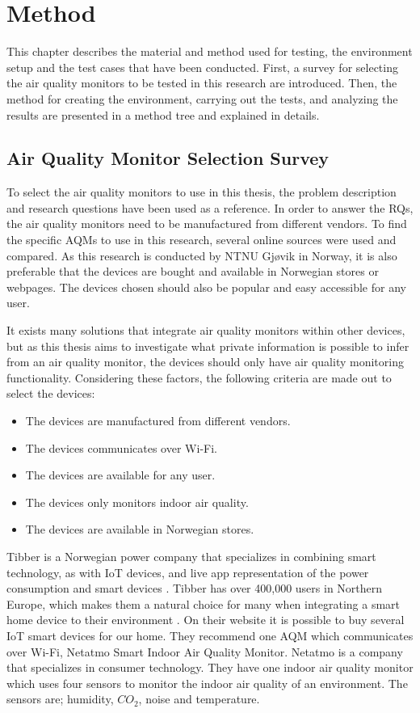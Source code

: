\chapter{Method}
This chapter describes the material and method used for testing, the environment setup and the test cases that have been conducted. First, a survey for selecting the air quality monitors to be tested in this research are introduced. Then, the method for creating the environment, carrying out the tests, and analyzing the results are presented in a method tree and explained in details.  

\section{Air Quality Monitor Selection Survey}
To select the air quality monitors to use in this thesis, the problem description and research questions have been used as a reference. In order to answer the RQs, the air quality monitors need to be manufactured from different vendors. To find the specific \gls{AQM}s to use in this research, several online sources were used and compared. As this research is conducted by NTNU Gjøvik in Norway, it is also preferable that the devices are bought and available in Norwegian stores or webpages. The devices chosen should also be popular and easy accessible for any user. 

It exists many solutions that integrate air quality monitors within other devices, but as this thesis aims to investigate what private information is possible to infer from an air quality monitor, the devices should only have air quality monitoring functionality.  Considering these factors, the following criteria are made out to select the devices:
\begin{itemize}
    \item The devices are manufactured from different vendors.
    \item The devices communicates over \gls{Wi-Fi}.
    \item The devices are available for any user.
    \item The devices only monitors indoor air quality.
    \item The devices are available in Norwegian stores.
\end{itemize}
Tibber \cite{Tibber} is a Norwegian power company that specializes in combining smart technology, as with \gls{IoT} devices, and live app representation of the power consumption and smart devices \cite{Tibber}.  Tibber has over 400,000 users in Northern Europe, which makes them a natural choice for many when integrating a smart home device to their environment \cite{TibberUsers}. On their website it is possible to buy several \gls{IoT} smart devices for our home. They recommend one \gls{AQM} which communicates over \gls{Wi-Fi}, Netatmo Smart Indoor Air Quality Monitor. Netatmo \cite{Netatmo} is a company that specializes in consumer technology. They have one indoor air quality monitor which uses four sensors to monitor the indoor air quality of an environment. The sensors are; humidity, \(CO_2\), noise and temperature. 

